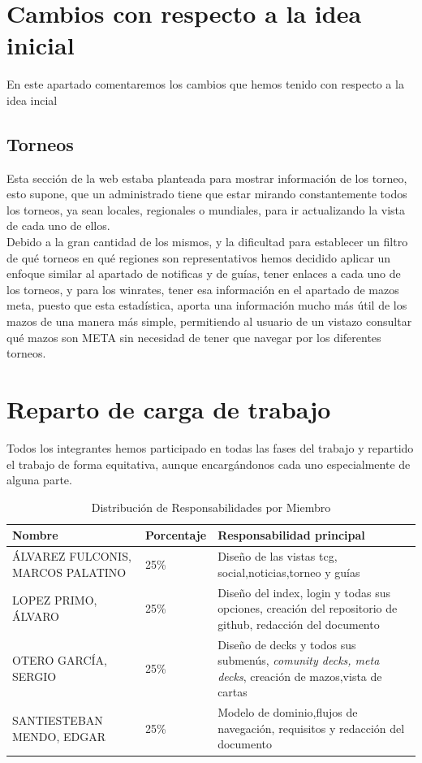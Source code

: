 \documentclass[10pt]{article}
\begin{document}
		
	
	\section{Cambios con respecto a la idea inicial}
		En este apartado comentaremos los cambios que hemos tenido con respecto a la idea incial
		\subsection{Torneos}
			Esta sección de la web estaba planteada para mostrar información de los torneo, esto supone, que un administrado tiene que estar mirando constantemente todos los torneos, ya sean locales, regionales o mundiales, para ir actualizando la vista de cada uno de ellos. \\ 
			Debido a la gran cantidad de los mismos, y  la dificultad para establecer un filtro de qué torneos en qué regiones son representativos hemos decidido aplicar un enfoque similar al apartado de notificas y de guías, tener enlaces a cada uno de los torneos, y para los winrates, tener esa información en el apartado de mazos meta, puesto que esta estadística, aporta una información mucho más útil de los mazos  de una manera más simple, permitiendo al usuario de un vistazo consultar qué mazos son META sin necesidad de tener que navegar por los diferentes torneos.
	\newpage
	\section{Reparto de carga de trabajo}
	Todos los integrantes hemos participado en todas las fases del trabajo y repartido el trabajo de forma equitativa, aunque encargándonos cada uno especialmente de alguna parte.\\
	
	\begin{table}[h]
		\centering
		\caption{Distribución de Responsabilidades por Miembro}
		\begin{tabularx}{\textwidth}{llX} 
			\toprule
			\textbf{Nombre} & \textbf{Porcentaje} & \textbf{Responsabilidad principal} \\
			\midrule
			ÁLVAREZ FULCONIS, MARCOS PALATINO      	& 25\%                & Diseño de las vistas tcg, social,noticias,torneo y guías\\
			LOPEZ PRIMO, ÁLVARO      				& 25\%                & Diseño del index, login y todas sus opciones, creación del repositorio de github, redacción del documento\\
			OTERO GARCÍA, SERGIO     				& 25\%                & Diseño de decks y todos sus submenús, \textit{comunity decks, meta decks}, creación de mazos,vista de cartas\\
			SANTIESTEBAN MENDO, EDGAR    			& 25\%                & Modelo de dominio,flujos de navegación, requisitos y redacción del documento\\
			\bottomrule
		\end{tabularx}
	\end{table}
	
\end{document}
